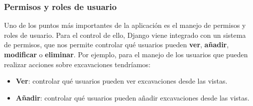 \subsubsection{Permisos y roles de usuario}
Uno de los puntos más importantes de la aplicación es el manejo de permisos y roles de
usuario. Para el control de ello, Django viene integrado con un sistema de permisos,
que nos permite controlar qué usuarios pueden \textbf{ver}, \textbf{añadir}, \textbf{
modificar} o \textbf{eliminar}. Por ejemplo, para el manejo de los usuarios que pueden
realizar acciones sobre excavaciones tendríamos:

    \begin{itemize}
        \item \textbf{Ver}: controlar qué usuarios pueden ver excavaciones desde las
        vistas.
    

        \item \textbf{Añadir}: controlar qué usuarios pueden añadir excavaciones
        desde las vistas.
    
    
    

\end{itemize}
